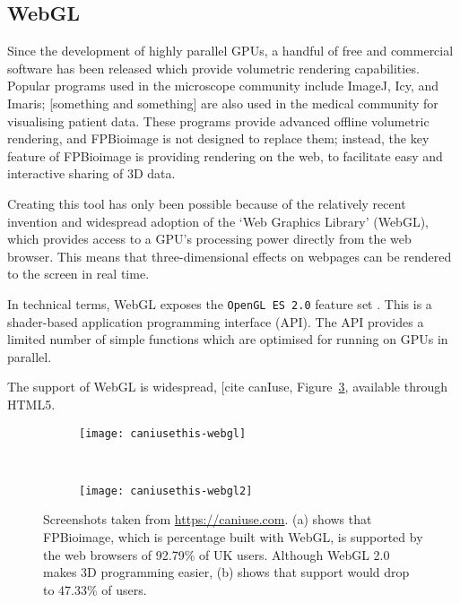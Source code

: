 \subsection{WebGL}
Since the development of highly parallel GPUs, a handful of free and commercial software has been released which provide volumetric rendering capabilities. 
Popular programs used in the microscope community include ImageJ, Icy, and Imaris; [something and something] are also used in the medical community for visualising patient data. 
These programs provide advanced offline volumetric rendering, and FPBioimage is not designed to replace them; instead, the key feature of FPBioimage is providing rendering on the web, to facilitate easy and interactive sharing of 3D data. 

Creating this tool has only been possible because of the relatively recent invention and widespread adoption of the `Web Graphics Library' (WebGL), which provides access to a GPU's processing power directly from the web browser. 
This means that three-dimensional effects on webpages can be rendered to the screen in real time.

In technical terms, WebGL exposes the \texttt{OpenGL ES 2.0} feature set \cite{Khronos:WebGL}.
This is a shader-based application programming interface (API).
The API provides a limited number of simple functions which are optimised for running on GPUs in parallel. 

The support of WebGL is widespread, [cite canIuse, Figure~\ref{fig:caniusethis}, available through HTML5.

\begin{figure}[htb!]
\centering
\begin{subfigure}[b]{1.0\textwidth}
\texttt{[image: caniusethis-webgl]}
\caption{} \label{fig:caniusethis-webgl}
\end{subfigure}

~\newline
\begin{subfigure}[b]{1.0\textwidth}
\texttt{[image: caniusethis-webgl2]}
\caption{} \label{fig:caniusethis-webgl2}
\end{subfigure}
\caption[FPBioimage: WebGL is supported by 92.79\% of users browsing the web]{Screenshots taken from \url{https://caniuse.com}\cite{caniuse}. (a) shows that FPBioimage, which is percentage built with WebGL, is supported by the web browsers of 92.79\% of UK users. Although WebGL 2.0 makes 3D programming easier, (b) shows that support would drop to 47.33\% of users.  }
\label{fig:caniusethis}
\end{figure}

